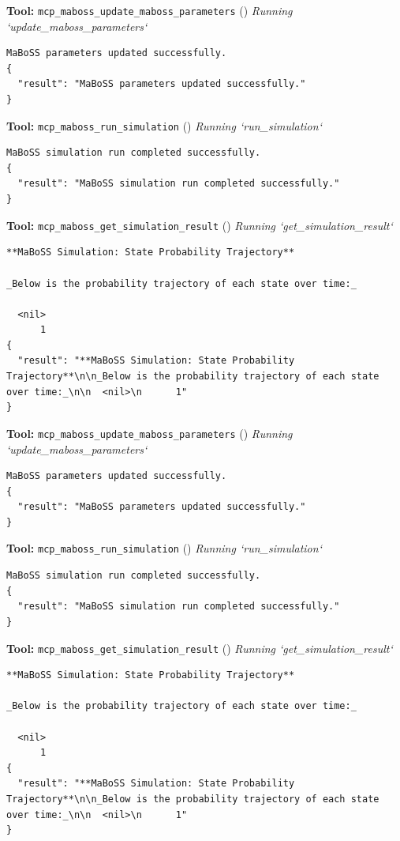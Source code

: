 \documentclass[11pt,a4paper]{article}
\begin{document}
\begin{toolokbox}
\textbf{Tool:} \texttt{mcp\_maboss\_update\_maboss\_parameters} (\checkmark)
\textit{Running `update\_maboss\_parameters`}
\begin{lstlisting}
MaBoSS parameters updated successfully.
{
  "result": "MaBoSS parameters updated successfully."
}
\end{lstlisting}
\end{toolokbox}
\begin{toolokbox}
\textbf{Tool:} \texttt{mcp\_maboss\_run\_simulation} (\checkmark)
\textit{Running `run\_simulation`}
\begin{lstlisting}
MaBoSS simulation run completed successfully.
{
  "result": "MaBoSS simulation run completed successfully."
}
\end{lstlisting}
\end{toolokbox}
\begin{toolokbox}
\textbf{Tool:} \texttt{mcp\_maboss\_get\_simulation\_result} (\checkmark)
\textit{Running `get\_simulation\_result`}
\begin{lstlisting}
**MaBoSS Simulation: State Probability Trajectory**

_Below is the probability trajectory of each state over time:_

  <nil>
      1
{
  "result": "**MaBoSS Simulation: State Probability Trajectory**\n\n_Below is the probability trajectory of each state over time:_\n\n  <nil>\n      1"
}
\end{lstlisting}
\end{toolokbox}
\begin{toolokbox}
\textbf{Tool:} \texttt{mcp\_maboss\_update\_maboss\_parameters} (\checkmark)
\textit{Running `update\_maboss\_parameters`}
\begin{lstlisting}
MaBoSS parameters updated successfully.
{
  "result": "MaBoSS parameters updated successfully."
}
\end{lstlisting}
\end{toolokbox}
\begin{toolokbox}
\textbf{Tool:} \texttt{mcp\_maboss\_run\_simulation} (\checkmark)
\textit{Running `run\_simulation`}
\begin{lstlisting}
MaBoSS simulation run completed successfully.
{
  "result": "MaBoSS simulation run completed successfully."
}
\end{lstlisting}
\end{toolokbox}
\begin{toolokbox}
\textbf{Tool:} \texttt{mcp\_maboss\_get\_simulation\_result} (\checkmark)
\textit{Running `get\_simulation\_result`}
\begin{lstlisting}
**MaBoSS Simulation: State Probability Trajectory**

_Below is the probability trajectory of each state over time:_

  <nil>
      1
{
  "result": "**MaBoSS Simulation: State Probability Trajectory**\n\n_Below is the probability trajectory of each state over time:_\n\n  <nil>\n      1"
}
\end{lstlisting}
\end{toolokbox}
\end{document}
